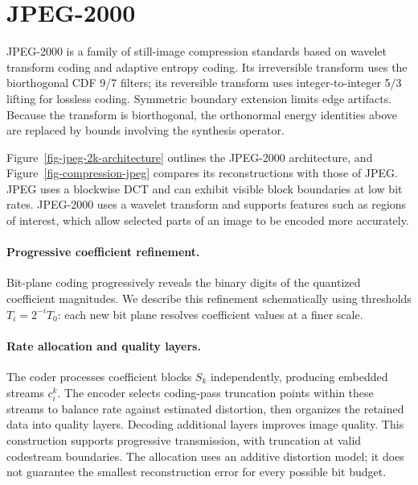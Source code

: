 \section{JPEG-2000}

JPEG-2000 is a family of still-image compression standards based on wavelet transform coding and adaptive entropy coding. Its irreversible transform uses the biorthogonal CDF 9/7 filters; its reversible transform uses integer-to-integer 5/3 lifting for lossless coding. Symmetric boundary extension limits edge artifacts. Because the transform is biorthogonal, the orthonormal energy identities above are replaced by bounds involving the synthesis operator.


Figure~\ref{fig-jpeg-2k-architecture} outlines the JPEG-2000 architecture, and Figure~\ref{fig-compression-jpeg} compares its reconstructions with those of JPEG. JPEG uses a blockwise DCT and can exhibit visible block boundaries at low bit rates. JPEG-2000 uses a wavelet transform and supports features such as regions of interest, which allow selected parts of an image to be encoded more accurately.
 


  
\paragraph{Progressive coefficient refinement.}

Bit-plane coding progressively reveals the binary digits of the quantized coefficient magnitudes. We describe this refinement schematically using thresholds $T_i = 2^{-i}T_0$: each new bit plane resolves coefficient values at a finer scale.

  
\paragraph{Rate allocation and quality layers.}
The coder processes coefficient blocks $S_k$ independently, producing embedded streams $c_i^k$. The encoder selects coding-pass truncation points within these streams to balance rate against estimated distortion, then organizes the retained data into quality layers. Decoding additional layers improves image quality. This construction supports progressive transmission, with truncation at valid codestream boundaries. The allocation uses an additive distortion model; it does not guarantee the smallest reconstruction error for every possible bit budget.

